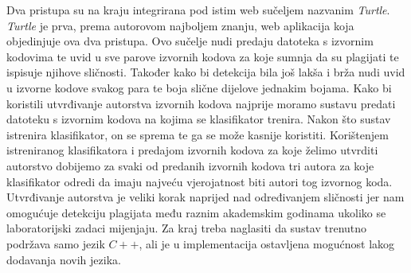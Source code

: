 	Dva pristupa su na kraju integrirana pod istim web sučeljem nazvanim \textit{Turtle}. \textit{Turtle} je prva, prema autorovom najboljem znanju, web aplikacija koja objedinjuje ova dva pristupa. Ovo sučelje nudi predaju datoteka s izvornim kodovima te uvid u sve parove izvornih kodova za koje sumnja da su plagijati te ispisuje njihove sličnosti. Također kako bi detekcija bila još lakša i brža nudi uvid u izvorne kodove svakog para te boja slične dijelove jednakim bojama. Kako bi koristili utvrđivanje autorstva izvornih kodova najprije moramo sustavu predati datoteku s izvornim kodova na kojima se klasifikator trenira. Nakon što sustav istrenira klasifikator, on se sprema te ga se može kasnije koristiti. Korištenjem istreniranog klasifikatora i predajom izvornih kodova za koje želimo utvrditi autorstvo dobijemo za svaki od predanih izvornih kodova tri autora za koje klasifikator odredi da imaju najveću vjerojatnost biti autori tog izvornog koda. Utvrđivanje autorstva je veliki korak naprijed nad određivanjem sličnosti jer nam omogućuje detekciju plagijata među raznim akademskim godinama ukoliko se laboratorijski zadaci mijenjaju. Za kraj treba naglasiti da sustav trenutno podržava samo jezik $C++$, ali je u implementacija ostavljena mogućnost lakog dodavanja novih jezika.
